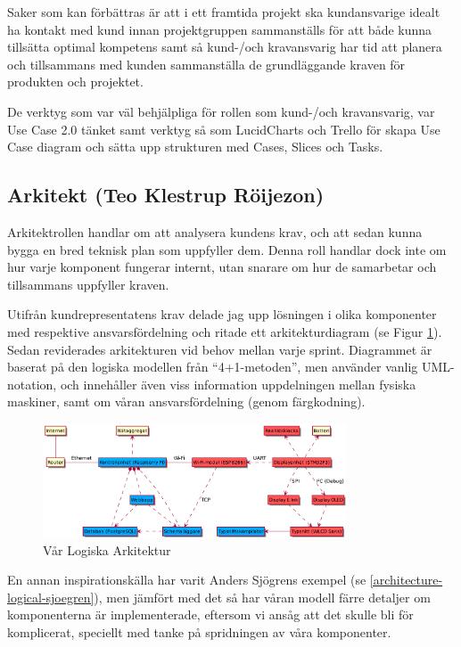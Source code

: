 \documentclass[conference,a4paper]{IEEEtran}
\begin{document}
Saker som kan förbättras är att i ett framtida projekt ska kundansvarige idealt ha kontakt med kund innan projektgruppen sammanställs för att både kunna tillsätta optimal kompetens samt så kund-/och kravansvarig har tid att planera och tillsammans med kunden sammanställa de grundläggande kraven för produkten och projektet.

De verktyg som var väl behjälpliga för rollen som kund-/och kravansvarig, var Use Case 2.0 \cite{Jacobson11} tänket samt verktyg så som LucidCharts och Trello för skapa Use Case diagram och sätta upp strukturen med Cases, Slices och Tasks. 

\subsection{Arkitekt (Teo Klestrup Röijezon)}
Arkitektrollen handlar om att analysera kundens krav, och att sedan kunna bygga en
bred teknisk plan som uppfyller dem. Denna roll handlar dock inte om hur varje
komponent fungerar internt, utan snarare om hur de samarbetar och tillsammans
uppfyller kraven.

Utifrån kundrepresentatens krav delade jag upp lösningen i olika komponenter
med respektive ansvarsfördelning och ritade ett arkitekturdiagram (se Figur
\ref{architecture-logical}). Sedan reviderades arkitekturen vid behov mellan
varje sprint. Diagrammet är baserat på den logiska modellen från
``4+1-metoden''\cite{Kruchten95}, men använder vanlig UML-notation, och innehåller
även viss information uppdelningen mellan fysiska maskiner, samt om våran
ansvarsfördelning (genom färgkodning).

\begin{figure}[H]
\centering
\includegraphics[width=9cm]{../../Arkitektur/Arkitektur-eps-converted-to.pdf}
\caption{Vår Logiska Arkitektur}
\label{architecture-logical}
\end{figure}

En annan inspirationskälla har varit Anders Sjögrens exempel (se
\ref{architecture-logical-sjoegren}), men jämfört med det så har våran
modell färre detaljer om komponenterna är implementerade, eftersom vi
ansåg att det skulle bli för komplicerat, speciellt med tanke på spridningen
av våra komponenter.
\end{document}
